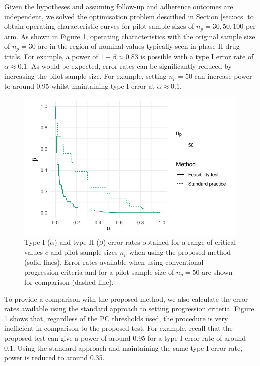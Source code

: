 \documentclass[AMA,STIX1COL]{WileyNJD-v2}
\begin{document}
Given the hypotheses and assuming follow-up and adherence outcomes are independent, we solved the optimisation problem described in Section \ref{sec:ocs} to obtain operating characteristic curves for pilot sample sizes of $n_p = 30, 50, 100$ per arm. As shown in Figure \ref{fig:ex_ocs}, operating characteristics with the original sample size of $n_p = 30$ are in the region of nominal values typically seen in phase II drug trials. For example, a power of $1-\beta \approx 0.83$ is possible with a type I error rate of $\alpha \approx 0.1$. As would be expected, error rates can be significantly reduced by increasing the pilot sample size. For example, setting $n_p = 50$ can increase power to around 0.95 whilst maintaining type I error at $\alpha \approx 0.1$.

\begin{figure}
\centering
\includegraphics[scale=0.8]{./Figures/ex_ocs.pdf}
\caption{Type I ($\alpha$) and type II ($\beta$) error rates obtained for a range of critical values $c$ and pilot sample sizes $n_p$ when using the proposed method (solid lines). Error rates available when using conventional progression criteria and for a pilot sample size of $n_p = 50$ are shown for comparison (dashed line).}
\label{fig:ex_ocs}
\end{figure}

To provide a comparison with the proposed method, we also calculate the error rates available using the standard approach to setting progression criteria. Figure \ref{fig:ex_ocs} shows that, regardless of the PC thresholds used, the procedure is very inefficient in comparison to the proposed test. For example, recall that the proposed test can give a power of around 0.95 for a type I error rate of around 0.1. Using the standard approach and maintaining the same type I error rate, power is reduced to around 0.35.
\end{document}
